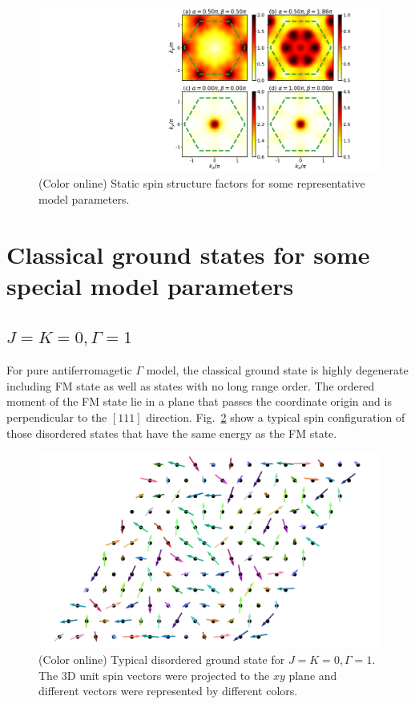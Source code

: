 \documentclass[aps,prb,reprint,amsfonts,amsmath,amssymb,showpacs,groupedaddress,superscriptaddress]{revtex4-1}
\begin{document}
\begin{figure}
    \centering
    \includegraphics[width=\columnwidth]{fig/AppendixSSF.pdf}
    \caption{\label{fig:AppendixSSF}(Color online) Static spin structure factors for some representative model parameters.}
\end{figure}

\section{\label{apx:DegeneratedStates}Classical ground states for some special model parameters}

\subsection{$J=K=0, \Gamma=1$}
For pure antiferromagetic $\Gamma$ model, the classical ground state is highly degenerate including FM state as well as states with no long range order. The ordered moment of the FM state lie in a plane that passes the coordinate origin and is perpendicular to the $[111]$ direction. Fig.~\ref{fig:GSForPositiveGamma} show a typical spin configuration of those disordered states that have the same energy as the FM state.
\begin{figure}
    \centering
    \includegraphics[width=\columnwidth]{fig/SpinConfigForPositiveGamma.pdf}
    \caption{\label{fig:GSForPositiveGamma}(Color online) Typical disordered ground state for $J=K=0, \Gamma=1$. The 3D unit spin vectors were projected to the $xy$ plane and different vectors were represented by different colors.}
\end{figure}
\end{document}
